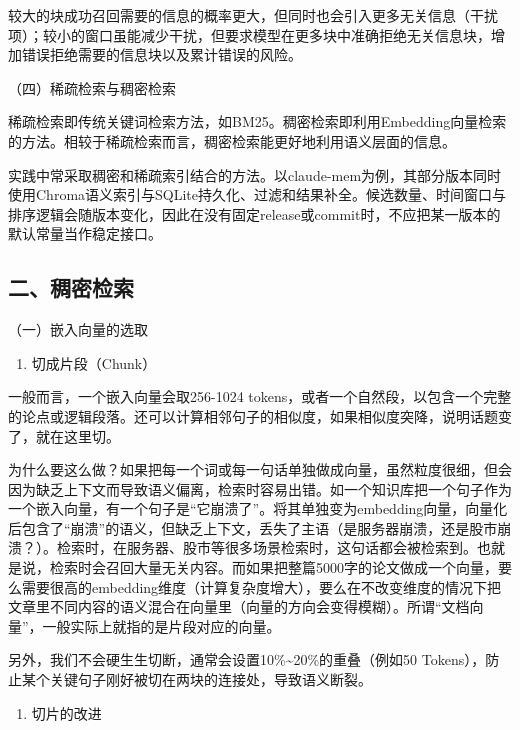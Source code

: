 较大的块成功召回需要的信息的概率更大，但同时也会引入更多无关信息（干扰项）；较小的窗口虽能减少干扰，但要求模型在更多块中准确拒绝无关信息块，增加错误拒绝需要的信息块以及累计错误的风险。

（四）稀疏检索与稠密检索

稀疏检索即传统关键词检索方法，如BM25。稠密检索即利用Embedding向量检索的方法。相较于稀疏检索而言，稠密检索能更好地利用语义层面的信息。

实践中常采取稠密和稀疏索引结合的方法。以claude-mem为例，其部分版本同时使用Chroma语义索引与SQLite持久化、过滤和结果补全。候选数量、时间窗口与排序逻辑会随版本变化，因此在没有固定release或commit时，不应把某一版本的默认常量当作稳定接口。

\hypertarget{ux4e8cux7a20ux5bc6ux68c0ux7d22}{%
\subsection{二、稠密检索}\label{ux4e8cux7a20ux5bc6ux68c0ux7d22}}

（一）嵌入向量的选取

\begin{enumerate}
\def\labelenumi{\arabic{enumi}.}
\tightlist
\item
  切成片段（Chunk）
\end{enumerate}

一般而言，一个嵌入向量会取256-1024 tokens，或者一个自然段，以包含一个完整的论点或逻辑段落。还可以计算相邻句子的相似度，如果相似度突降，说明话题变了，就在这里切。

为什么要这么做？如果把每一个词或每一句话单独做成向量，虽然粒度很细，但会因为缺乏上下文而导致语义偏离，检索时容易出错。如一个知识库把一个句子作为一个嵌入向量，有一个句子是``它崩溃了''。将其单独变为embedding向量，向量化后包含了``崩溃''的语义，但缺乏上下文，丢失了主语（是服务器崩溃，还是股市崩溃？）。检索时，在服务器、股市等很多场景检索时，这句话都会被检索到。也就是说，检索时会召回大量无关内容。而如果把整篇5000字的论文做成一个向量，要么需要很高的embedding维度（计算复杂度增大），要么在不改变维度的情况下把文章里不同内容的语义混合在向量里（向量的方向会变得模糊）。所谓``文档向量''，一般实际上就指的是片段对应的向量。

另外，我们不会硬生生切断，通常会设置10\%\textasciitilde20\%的重叠（例如50 Tokens），防止某个关键句子刚好被切在两块的连接处，导致语义断裂。

\begin{enumerate}
\def\labelenumi{\arabic{enumi}.}
\setcounter{enumi}{1}
\tightlist
\item
  切片的改进
\end{enumerate}

